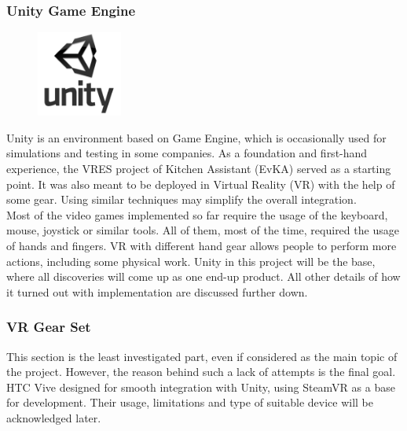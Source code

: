 \subsubsection{Unity Game Engine} \label{subsubsec:Unity}
\begin{figure}
    \centering
    \includegraphics[width=0.25\textwidth]{project/images/Unity-Logo.png}
\end{figure}
Unity is an environment based on Game Engine, which is occasionally used for simulations and testing in some companies.
As a foundation and first-hand experience, the VRES project of Kitchen Assistant (EvKA) served as a starting point.
It was also meant to be deployed in Virtual Reality (VR) with the help of some gear.
Using similar techniques may simplify the overall integration. \\[1pc]
Most of the video games implemented so far require the usage of the keyboard, mouse, joystick or similar tools.
All of them, most of the time, required the usage of hands and fingers.
VR with different hand gear allows people to perform more actions, including some physical work.
Unity in this project will be the base, where all discoveries will come up as one end-up product.
All other details of how it turned out with implementation are discussed further down.
\subsubsection{VR Gear Set}
This section is the least investigated part, even if considered as the main topic of the project.
However, the reason behind such a lack of attempts is the final goal.
HTC Vive designed for smooth integration with Unity, using SteamVR as a base for development.
Their usage, limitations and type of suitable device will be acknowledged later.
